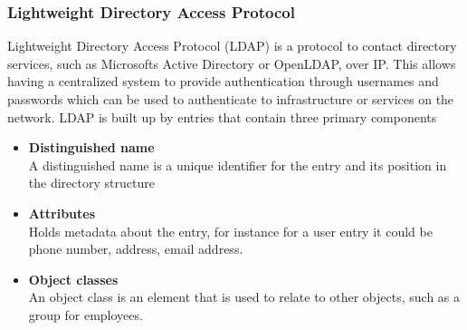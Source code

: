 \documentclass[../main.tex]{subfiles}
\begin{document}
\subsubsection*{Lightweight Directory Access Protocol}
Lightweight Directory Access Protocol (LDAP) is a protocol to contact directory services, such as Microsofts Active Directory or OpenLDAP, over IP. This allows having a centralized system to provide authentication through usernames and passwords which can be used to authenticate to infrastructure or services on the network. LDAP is built up by entries that contain three primary components
\begin{itemize}
    \item\textbf{Distinguished name}\\
            A distinguished name is a unique identifier for the entry and its position in the directory structure
    \item\textbf{Attributes}\\
            Holds metadata about the entry, for instance for a user entry it could be phone number, address, email address.
    \item\textbf{Object classes}\\
            An object class is an element that is used to relate to other objects, such as a group for employees.
\end{itemize}
\end{document}
